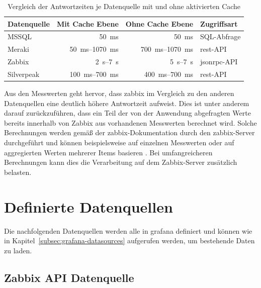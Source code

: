 \begin{table}[H]
    \centering
    \begin{tabular}{lrrl}
        \toprule
        \textbf{Datenquelle} & \textbf{Mit Cache Ebene} & \textbf{Ohne Cache Ebene} & \textbf{Zugriffsart} \\
        \midrule
        MSSQL      & \SI{50}{\milli\second}            & \SI{50}{\milli\second}            & SQL-Abfrage \\
        Meraki     & \SIrange{50}{1070}{\milli\second}          & \SIrange{700}{1070}{\milli\second}             & \gls{rest}-API \\
        Zabbix     & \SIrange{2}{7}{\second}           & \SIrange{5}{7}{\second}            & \gls{jsonrpc}-API \\
        Silverpeak & \SIrange{100}{700}{\milli\second} & \SIrange{400}{700}{\milli\second}  & \gls{rest}-API \\
        \bottomrule
    \end{tabular}
    \caption{Vergleich der Antwortzeiten je Datenquelle mit und ohne aktivierten Cache}
    \label{tab:reaction-times-comparison}
\end{table}

Aus den Messwerten geht hervor, dass \gls{zabbix} im Vergleich zu
den anderen Datenquellen eine deutlich höhere Antwortzeit aufweist. Dies
ist unter anderem darauf zurückzuführen, dass ein Teil der von der
Anwendung abgefragten Werte bereits innerhalb von Zabbix aus vorhandenen
Messwerten berechnet wird. Solche Berechnungen werden gemäß der
\gls{zabbix}-Dokumentation durch den \gls{zabbix}-Server durchgeführt und können
beispielsweise auf einzelnen Messwerten oder auf aggregierten Werten
mehrerer Items basieren \cite{zabbix2026calculateditems}. Bei umfangreicheren
Berechnungen kann dies die Verarbeitung auf dem Zabbix-Server zusätzlich
belasten.

\section{Definierte Datenquellen}
\label{sec:defined-sources}

Die nachfolgenden Datenquellen werden alle in \gls{grafana} definiert und können wie in Kapitel~\ref{subsec:grafana-datasources} aufgerufen
werden, um bestehende Daten zu laden.

\subsection{Zabbix API Datenquelle}

